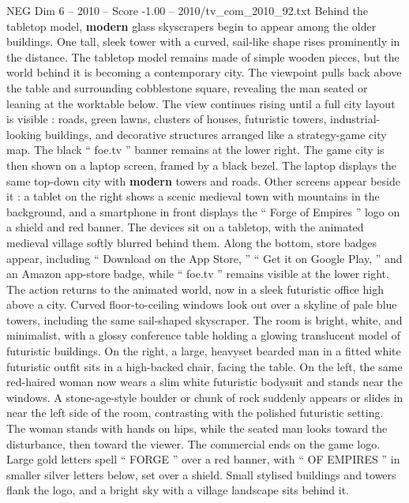 \begin{textsample}{NEG Dim 6 – 2010 – Score -1.00 – 2010/tv\_com\_2010\_92.txt}
Behind the tabletop model, \textbf{modern} glass skyscrapers begin to appear among the older buildings.
One tall, sleek tower with a curved, sail-like shape rises prominently in the distance.
The tabletop model remains made of simple wooden pieces, but the world behind it is becoming a contemporary city.
The viewpoint pulls back above the table and surrounding cobblestone square, revealing the man seated or leaning at the worktable below.
The view continues rising until a full city layout is visible : roads, green lawns, clusters of houses, futuristic towers, industrial-looking buildings, and decorative structures arranged like a strategy-game city map.
The black “ foe.tv ” banner remains at the lower right.
The game city is then shown on a laptop screen, framed by a black bezel.
The laptop displays the same top-down city with \textbf{modern} towers and roads.
Other screens appear beside it : a tablet on the right shows a scenic medieval town with mountains in the background, and a smartphone in front displays the “ Forge of Empires ” logo on a shield and red banner.
The devices sit on a tabletop, with the animated medieval village softly blurred behind them.
Along the bottom, store badges appear, including “ Download on the App Store, ” “ Get it on Google Play, ” and an Amazon app-store badge, while “ foe.tv ” remains visible at the lower right.
The action returns to the animated world, now in a sleek futuristic office high above a city.
Curved floor-to-ceiling windows look out over a skyline of pale blue towers, including the same sail-shaped skyscraper.
The room is bright, white, and minimalist, with a glossy conference table holding a glowing translucent model of futuristic buildings.
On the right, a large, heavyset bearded man in a fitted white futuristic outfit sits in a high-backed chair, facing the table.
On the left, the same red-haired woman now wears a slim white futuristic bodysuit and stands near the windows.
A stone-age-style boulder or chunk of rock suddenly appears or slides in near the left side of the room, contrasting with the polished futuristic setting.
The woman stands with hands on hips, while the seated man looks toward the disturbance, then toward the viewer.
The commercial ends on the game logo.
Large gold letters spell “ FORGE ” over a red banner, with “ OF EMPIRES ” in smaller silver letters below, set over a shield.
Small stylised buildings and towers flank the logo, and a bright sky with a village landscape sits behind it.

\end{textsample}
